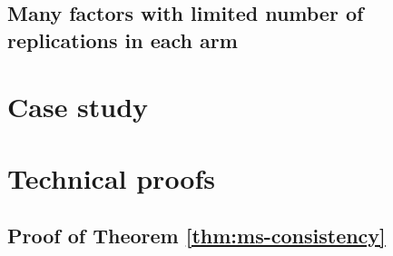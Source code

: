 \documentclass[12pt]{article}
\begin{document}
\subsection{Many factors with limited number of replications in each arm}


\section{Case study}

\section{Technical proofs}

\subsection{Proof of Theorem \ref{thm:ms-consistency}}
\end{document}
